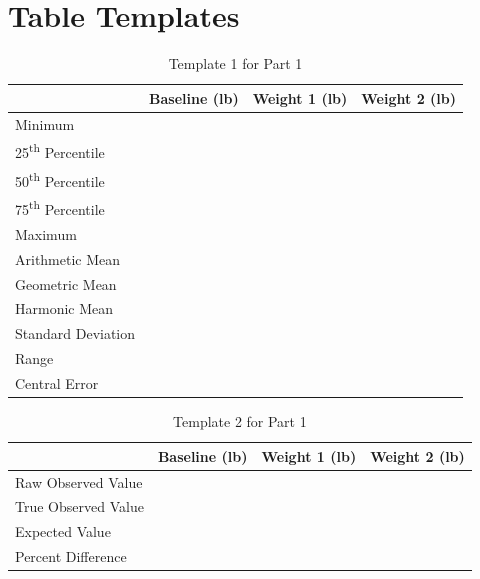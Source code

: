 \section{Table Templates}
%
\begin{table}[ht!]
    \begin{center}
        \begin{tabular}{l | l | l | l}
            & \textbf{Baseline} (lb) & \textbf{Weight 1} (lb) & \textbf{Weight 2} (lb) \\
            \hline
            Minimum & & & \\
            25\textsuperscript{th} Percentile & & & \\
            50\textsuperscript{th} Percentile & & & \\
            75\textsuperscript{th} Percentile & & & \\
            Maximum & & & \\
            \hline
            Arithmetic Mean & & & \\
            Geometric Mean & & & \\
            Harmonic Mean & & & \\
            Standard Deviation & & & \\
            \hline
            Range & & & \\
            Central Error & & & \\
            \hline
        \end{tabular}
    \end{center}
    \caption{Template 1 for Part 1}
    \label{table.00.template.1}
\end{table}
%
\begin{table}[ht!]
    \begin{center}
        \begin{tabular}{l | l | l | l}
            & \textbf{Baseline} (lb) & \textbf{Weight 1} (lb) & \textbf{Weight 2} (lb) \\
            \hline
            Raw Observed Value & & & \\
            True Observed Value & & & \\
            Expected Value & & & \\
            \hline
            Percent Difference & & & \\
            \hline
        \end{tabular}
    \end{center}
    \caption{Template 2 for Part 1}
    \label{table.00.template.2}
\end{table}
